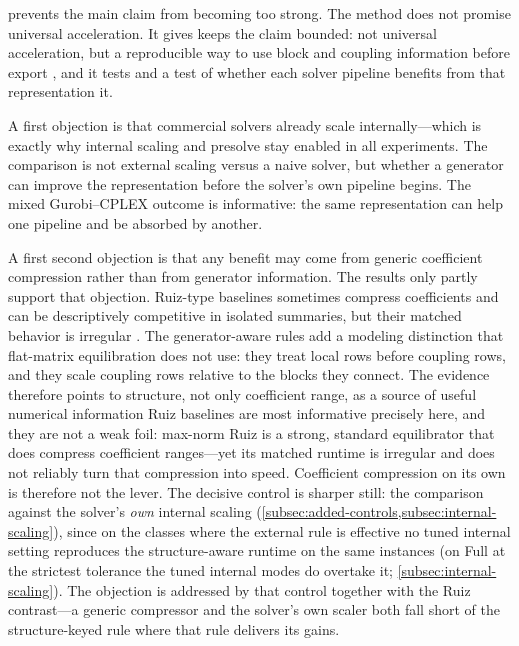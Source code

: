 \documentclass[AMA,Times1COL]{WileyNJDv5} %
\providecommand{\DIFadd}[1]{{\protect\color{blue} \sf #1}} %
\providecommand{\DIFdel}[1]{{\protect\color{red} \scriptsize #1}} %
\providecommand{\DIFaddbegin}{} %
\providecommand{\DIFaddend}{} %
\providecommand{\DIFdelbegin}{} %
\providecommand{\DIFdelend}{} %
\begin{document}
 \DIFdelbegin \DIFdel{prevents the main claim from becoming too strong. The method does
not promise universal acceleration. It gives }\DIFdelend \DIFaddbegin \DIFadd{keeps the claim bounded: not universal acceleration, but }\DIFaddend a
reproducible way to use block and coupling information before export \DIFdelbegin \DIFdel{, and it tests }\DIFdelend \DIFaddbegin \DIFadd{and a test of }\DIFaddend whether
each solver pipeline benefits from \DIFdelbegin \DIFdel{that
representation}\DIFdelend \DIFaddbegin \DIFadd{it.
}

\DIFadd{A first objection is that commercial solvers already scale internally---which is exactly why
internal scaling and presolve stay enabled in all experiments. The comparison is not external
scaling versus a naive solver, but whether a generator can improve the representation before
the solver's own pipeline begins. The mixed Gurobi--CPLEX outcome is informative: the same
representation can help one pipeline and be absorbed by another}\DIFaddend .

A \DIFdelbegin \DIFdel{first }\DIFdelend \DIFaddbegin \DIFadd{second }\DIFaddend objection is that any benefit may come from generic coefficient compression rather
than from generator information. The \DIFdelbegin \DIFdel{results only partly support that objection. Ruiz-type
baselines sometimes compress coefficients and
can be descriptively competitive in isolated
summaries, but their matched behavior is irregular . The generator-aware rules add a modeling distinction that flat-matrix equilibration does not use: they treat local rows
before coupling rows, and they scale coupling rows relative to the blocks they connect.
The evidence therefore points to structure, not only coefficient range, as a source of useful numerical information}\DIFdelend \DIFaddbegin \DIFadd{Ruiz baselines are most informative precisely here, and
they are not a weak foil: max-norm Ruiz is a strong, standard equilibrator that does compress
coefficient ranges---yet its matched runtime is irregular and does not reliably turn that
compression into speed. Coefficient compression on its own is therefore not the lever. The
decisive control is sharper still: the comparison against the solver's \emph{own} internal
scaling (\cref{subsec:added-controls,subsec:internal-scaling}), since on the classes where the
external rule is effective no tuned internal setting reproduces the structure-aware runtime on
the same instances (on Full at the strictest tolerance the tuned internal modes do overtake it;
\cref{subsec:internal-scaling}). The objection is addressed by that
control together with the Ruiz contrast---a generic compressor and the solver's own scaler both
fall short of the structure-keyed rule where that rule delivers its gains.
}
\end{document}
